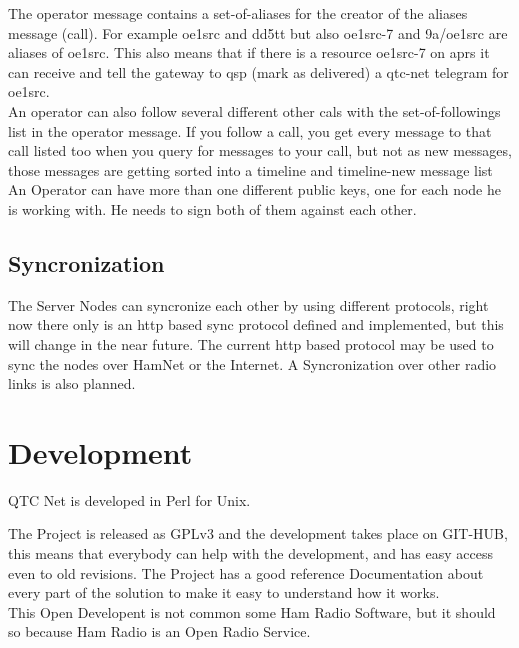 \documentclass{article}
\begin{document}
The operator message contains a set-of-aliases for the creator of the aliases 
message (call). For example oe1src and dd5tt but also oe1src-7 and 9a/oe1src 
are aliases of oe1src. This also means that if there is a resource oe1src-7 
on aprs it can receive and tell the gateway to qsp (mark as delivered) a qtc-net 
telegram for oe1src. \\

An operator can also follow several different other cals with the set-of-followings
list in the operator message.  If you follow a call, you get every message to that call 
listed  too when you query for messages to your call, but not as new messages, those 
messages are getting sorted into a timeline and timeline-new message list\\

An Operator can have more than one different public keys, one for each 
node he is working with. He needs to sign both of them against each other. \\

\subsection{Syncronization}

The Server Nodes can syncronize each other by using different protocols, right
now there only is an http based sync protocol defined and implemented, but this
will change in the near future. The current http based protocol may be used to 
sync the nodes over HamNet or the Internet. A Syncronization over other radio 
links is also planned.  \\

\section{Development}

QTC Net is developed in Perl for Unix.

The Project is released as GPLv3 and the development takes place on GIT-HUB,
this means that everybody can help with the development, and has easy access
even to old revisions. The Project has a good reference Documentation about
every part of the solution to make it easy to understand how it works. \\

This Open Developent is not common some Ham Radio Software, but it should so 
because Ham Radio is an Open Radio Service. \\
\end{document}
